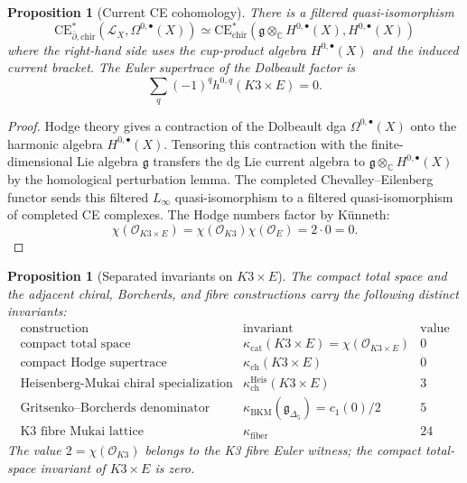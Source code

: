 \documentclass[11pt]{amsart}
\providecommand{\C}{\mathbb{C}}
\providecommand{\dbar}{\bar{\partial}}
\providecommand{\g}{\mathfrak{g}}
\providecommand{\CE}{\mathrm{CE}}
\providecommand{\chir}{\mathrm{chir}}
\providecommand{\cL}{\mathcal{L}}
\providecommand{\cO}{\mathcal{O}}
\providecommand{\Linf}{L_\infty}
\theoremstyle{plain}
\newtheorem{proposition}[theorem]{Proposition}
\theoremstyle{definition}
\theoremstyle{remark}
\begin{document}
\begin{proposition}[Current CE cohomology]\label{prop:k3e-current-ce}
There is a filtered quasi-isomorphism
\[
  \CE_{\dbar,\chir}^{*}(\cL_X,\Omega^{0,\bullet}(X))
  \simeq
  \CE_{\chir}^{*}
  \left(\g\otimes_{\C}H^{0,\bullet}(X),H^{0,\bullet}(X)\right)
\]
where the right-hand side uses the cup-product algebra
$H^{0,\bullet}(X)$ and the induced current bracket. The Euler
supertrace of the Dolbeault factor is
\[
  \sum_q(-1)^q h^{0,q}(K3\times E)=0.
\]
\end{proposition}

\begin{proof}
Hodge theory gives a contraction of the Dolbeault dga
$\Omega^{0,\bullet}(X)$ onto the harmonic algebra $H^{0,\bullet}(X)$.
Tensoring this contraction with the finite-dimensional Lie algebra
$\g$ transfers the dg Lie current algebra to
$\g\otimes_\C H^{0,\bullet}(X)$ by the homological perturbation lemma.
The completed Chevalley--Eilenberg functor sends this filtered
$\Linf$ quasi-isomorphism to a filtered quasi-isomorphism of completed
CE complexes. The Hodge numbers factor by K\"unneth:
\[
  \chi(\cO_{K3\times E})
  =
  \chi(\cO_{K3})\chi(\cO_E)
  =
  2\cdot 0
  =
  0.
\]
\end{proof}

\begin{proposition}[Separated invariants on \texorpdfstring{$K3\times E$}{K3xE}]
\label{prop:k3e-separated-invariants}
The compact total space and the adjacent chiral, Borcherds, and fibre
constructions carry the following distinct invariants:
\[
\begin{array}{c|c|c}
\text{construction} & \text{invariant} & \text{value}\\
\hline
\text{compact total space} &
\kappa_{\mathrm{cat}}(K3\times E)=\chi(\cO_{K3\times E}) & 0\\
\text{compact Hodge supertrace} &
\kappa_{\mathrm{ch}}(K3\times E) & 0\\
\text{Heisenberg-Mukai chiral specialization} &
\kappa_{\mathrm{ch}}^{\mathrm{Heis}}(K3\times E) & 3\\
\text{Gritsenko--Borcherds denominator} &
\kappa_{\mathrm{BKM}}(\mathfrak{g}_{\Delta_5})=c_1(0)/2 & 5\\
\text{K3 fibre Mukai lattice} &
\kappa_{\mathrm{fiber}} & 24
\end{array}
\]
The value $2=\chi(\cO_{K3})$ belongs to the K3 fibre Euler witness; the
compact total-space invariant of $K3\times E$ is zero.
\end{proposition}
\end{document}
